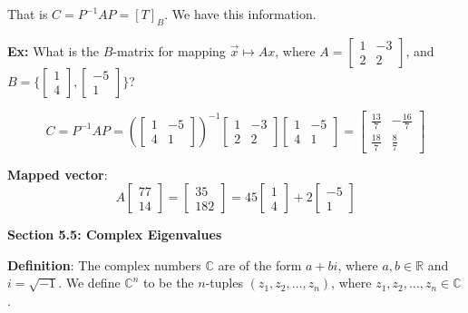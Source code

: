 \documentclass{article}
\begin{document}
That is $C = P^{-1}AP = [T]_B$. We have this information.

\textbf{Ex:} What is the $B$-matrix for mapping $\vec{x} \mapsto Ax$, where $A = \left[ \begin{array}{cc} 1 & -3 \\ 2 & 2 \end{array} \right]$, and $B = \{\begin{bmatrix} 1 \\ 4 \end{bmatrix}, \begin{bmatrix} -5 \\ 1 \end{bmatrix}\}$?

\[ C = P^{-1}AP = \left( \left[ \begin{array}{cc} 1 & -5 \\ 4 & 1 \end{array} \right] \right)^{-1} \left[ \begin{array}{cc} 1 & -3 \\ 2 & 2 \end{array} \right] \left[ \begin{array}{cc} 1 & -5 \\ 4 & 1 \end{array} \right] = \left[ \begin{array}{cc} \frac{13}{7} & -\frac{16}{7} \\ \frac{18}{7} & \frac{8}{7} \end{array} \right] \]


\textbf{Mapped vector}: 
\[
A \begin{bmatrix} 77 \\ 14 \end{bmatrix} = \begin{bmatrix} 35 \\ 182 \end{bmatrix} = 45 \begin{bmatrix} 1 \\ 4 \end{bmatrix} + 2 \begin{bmatrix} -5 \\ 1 \end{bmatrix}
\]

\textbf{Section 5.5: Complex Eigenvalues}

\textbf{Definition}: 
The complex numbers \( \mathbb{C} \) are of the form \( a + bi \), where \( a, b \in \mathbb{R} \) and \( i = \sqrt{-1} \). We define \( \mathbb{C}^n \) to be the \( n \)-tuples \( (z_1, z_2, \ldots, z_n) \), where \( z_1, z_2, \ldots, z_n \in \mathbb{C} \).
\end{document}
